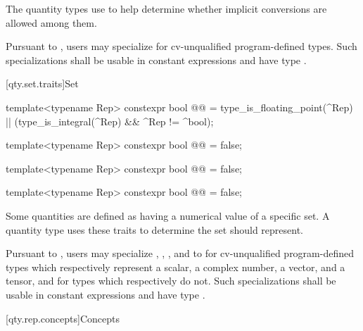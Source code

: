 \begin{itemdescr}
\pnum
The quantity types use 
to help determine whether implicit conversions are allowed among them.

\pnum
\remarks
Pursuant to ,
users may specialize 
for cv-unqualified program-defined types.
Such specializations shall be usable in constant expressions
and have type .
\end{itemdescr}

[qty.set.traits]{Set}

\begin{itemdecl}
template<typename Rep>
constexpr bool @@ =
  type_is_floating_point(^Rep) || (type_is_integral(^Rep) && ^Rep != ^bool);

template<typename Rep>
constexpr bool @@ = false;

template<typename Rep>
constexpr bool @@ = false;

template<typename Rep>
constexpr bool @@ = false;
\end{itemdecl}

\begin{itemdescr}
\pnum
Some quantities are defined as having a numerical value of a specific set.
A quantity type  uses these traits
to determine the set  should represent.

\pnum
\remarks
Pursuant to ,
users may specialize , , , and  to 
for cv-unqualified program-defined types
which respectively represent
a scalar,
a complex number,
a vector, and
a tensor,
and  for types which respectively do not.
Such specializations shall be usable in constant expressions
and have type .
\end{itemdescr}

[qty.rep.concepts]{Concepts}

